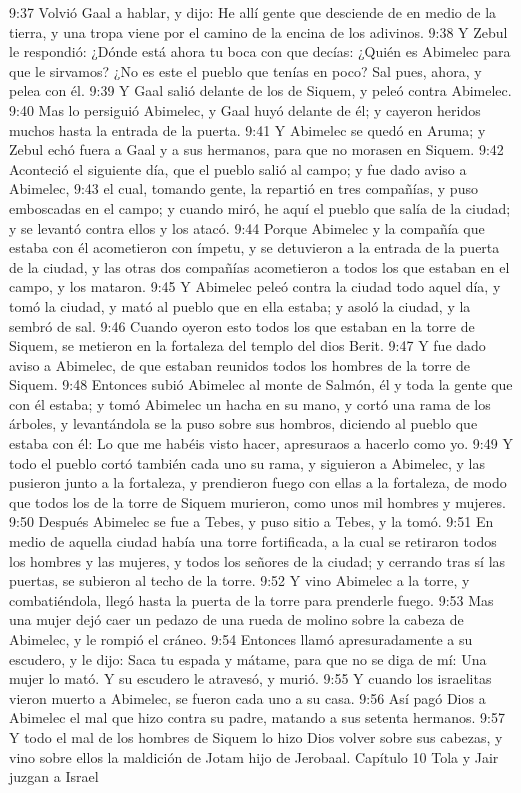 9:37 Volvió Gaal a hablar, y dijo: He allí gente que desciende de en medio de la tierra, y una tropa viene por el camino de la encina de los adivinos.  
9:38 Y Zebul le respondió: ¿Dónde está ahora tu boca con que decías: ¿Quién es Abimelec para que le sirvamos? ¿No es este el pueblo que tenías en poco? Sal pues, ahora, y pelea con él.  
9:39 Y Gaal salió delante de los de Siquem, y peleó contra Abimelec.  
9:40 Mas lo persiguió Abimelec, y Gaal huyó delante de él; y cayeron heridos muchos hasta la entrada de la puerta.  
9:41 Y Abimelec se quedó en Aruma; y Zebul echó fuera a Gaal y a sus hermanos, para que no morasen en Siquem.  
9:42 Aconteció el siguiente día, que el pueblo salió al campo; y fue dado aviso a Abimelec,  
9:43 el cual, tomando gente, la repartió en tres compañías, y puso emboscadas en el campo; y cuando miró, he aquí el pueblo que salía de la ciudad; y se levantó contra ellos y los atacó.  
9:44 Porque Abimelec y la compañía que estaba con él acometieron con ímpetu, y se detuvieron a la entrada de la puerta de la ciudad, y las otras dos compañías acometieron a todos los que estaban en el campo, y los mataron.  
9:45 Y Abimelec peleó contra la ciudad todo aquel día, y tomó la ciudad, y mató al pueblo que en ella estaba; y asoló la ciudad, y la sembró de sal.  
9:46 Cuando oyeron esto todos los que estaban en la torre de Siquem, se metieron en la fortaleza del templo del dios Berit.  
9:47 Y fue dado aviso a Abimelec, de que estaban reunidos todos los hombres de la torre de Siquem.  
9:48 Entonces subió Abimelec al monte de Salmón, él y toda la gente que con él estaba; y tomó Abimelec un hacha en su mano, y cortó una rama de los árboles, y levantándola se la puso sobre sus hombros, diciendo al pueblo que estaba con él: Lo que me habéis visto hacer, apresuraos a hacerlo como yo.  
9:49 Y todo el pueblo cortó también cada uno su rama, y siguieron a Abimelec, y las pusieron junto a la fortaleza, y prendieron fuego con ellas a la fortaleza, de modo que todos los de la torre de Siquem murieron, como unos mil hombres y mujeres.  
9:50 Después Abimelec se fue a Tebes, y puso sitio a Tebes, y la tomó.  
9:51 En medio de aquella ciudad había una torre fortificada, a la cual se retiraron todos los hombres y las mujeres, y todos los señores de la ciudad; y cerrando tras sí las puertas, se subieron al techo de la torre.  
9:52 Y vino Abimelec a la torre, y combatiéndola, llegó hasta la puerta de la torre para prenderle fuego.  
9:53 Mas una mujer dejó caer un pedazo de una rueda de molino sobre la cabeza de Abimelec, y le rompió el cráneo.  
9:54 Entonces llamó apresuradamente a su escudero, y le dijo: Saca tu espada y mátame, para que no se diga de mí: Una mujer lo mató. Y su escudero le atravesó, y murió.  
9:55 Y cuando los israelitas vieron muerto a Abimelec, se fueron cada uno a su casa.  
9:56 Así pagó Dios a Abimelec el mal que hizo contra su padre, matando a sus setenta hermanos.  
9:57 Y todo el mal de los hombres de Siquem lo hizo Dios volver sobre sus cabezas, y vino sobre ellos la maldición de Jotam hijo de Jerobaal.  
Capítulo 10 
Tola y Jair juzgan a Israel  

